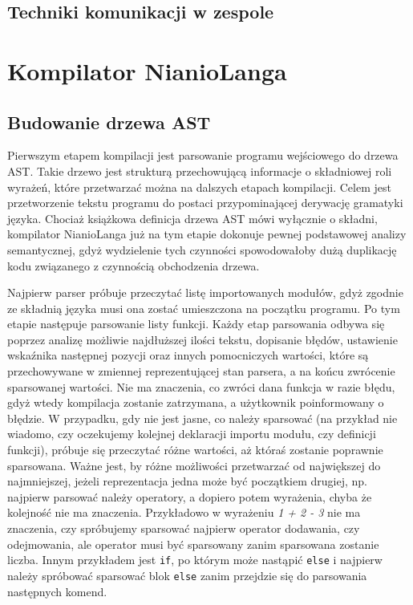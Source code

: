 \documentclass[licencjacka]{pracamgr}
\begin{document}
\section{Techniki komunikacji w zespole}

\chapter{Kompilator NianioLanga}
\section{Budowanie drzewa AST}
Pierwszym etapem kompilacji jest parsowanie programu wejściowego do drzewa AST. Takie drzewo jest strukturą przechowującą informacje o składniowej roli wyrażeń, które przetwarzać można na dalszych etapach kompilacji. Celem jest przetworzenie tekstu programu do postaci przypominającej derywację gramatyki języka. Chociaż książkowa definicja drzewa AST mówi wyłącznie o składni, kompilator NianioLanga już na tym etapie dokonuje pewnej podstawowej analizy semantycznej, gdyż wydzielenie tych czynności spowodowałoby dużą duplikację kodu związanego z czynnością obchodzenia drzewa.

Najpierw parser próbuje przeczytać listę importowanych modułów, gdyż zgodnie ze składnią języka musi ona zostać umieszczona na początku programu. Po tym etapie następuje parsowanie listy funkcji. Każdy etap parsowania odbywa się poprzez analizę możliwie najdłuższej ilości tekstu, dopisanie błędów, ustawienie wskaźnika następnej pozycji oraz innych pomocniczych wartości, które są przechowywane w zmiennej reprezentującej stan parsera, a na końcu zwrócenie sparsowanej wartości. Nie ma znaczenia, co zwróci dana funkcja w razie błędu, gdyż wtedy kompilacja zostanie zatrzymana, a użytkownik poinformowany o błędzie. W przypadku, gdy nie jest jasne, co należy sparsować (na przykład nie wiadomo, czy oczekujemy kolejnej deklaracji importu modułu, czy definicji funkcji), próbuje się przeczytać różne wartości, aż któraś zostanie poprawnie sparsowana. Ważne jest, by różne możliwości przetwarzać od największej do najmniejszej, jeżeli reprezentacja jedna może być początkiem drugiej, np. najpierw parsować należy operatory, a dopiero potem wyrażenia, chyba że kolejność nie ma znaczenia. Przykładowo w wyrażeniu \emph{1 + 2 - 3} nie ma znaczenia, czy spróbujemy sparsować najpierw operator dodawania, czy odejmowania, ale operator musi być sparsowany zanim sparsowana zostanie liczba. Innym przykładem jest \texttt{if}, po którym może nastąpić \texttt{else} i najpierw należy spróbować sparsować blok \texttt{else} zanim przejdzie się do parsowania następnych komend.
\end{document}
